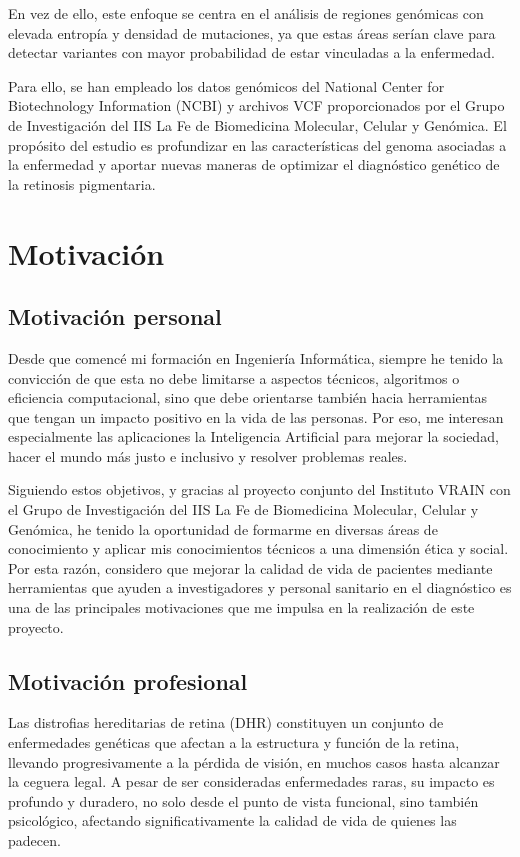 \documentclass[11pt,spanish,listoffigures,listoftables]{tfgetsinf}
\begin{document}
 

En vez de ello, este enfoque se centra en el análisis de regiones genómicas con elevada entropía y densidad de mutaciones, ya que estas áreas serían clave para detectar variantes con mayor probabilidad de estar vinculadas a la enfermedad. 

 

Para ello, se han empleado los datos genómicos del National Center for Biotechnology Information (NCBI) y archivos VCF proporcionados por el Grupo de Investigación del IIS La Fe de Biomedicina Molecular, Celular y Genómica. El propósito del estudio es profundizar en las características del genoma asociadas a la enfermedad y aportar nuevas maneras de optimizar el diagnóstico genético de la retinosis pigmentaria. 

\section{Motivación}

\subsection{Motivación personal}
Desde que comencé mi formación en Ingeniería Informática, siempre he tenido la convicción de que esta no debe limitarse a aspectos técnicos, algoritmos o eficiencia computacional, sino que debe orientarse también hacia herramientas que tengan un impacto positivo en la vida de las personas. Por eso, me interesan especialmente las aplicaciones la Inteligencia Artificial para mejorar la sociedad, hacer el mundo más justo e inclusivo y resolver problemas reales.  

Siguiendo estos objetivos, y gracias al proyecto conjunto del Instituto VRAIN con el Grupo de Investigación del IIS La Fe de Biomedicina Molecular, Celular y Genómica, he tenido la oportunidad de formarme en diversas áreas de conocimiento y aplicar mis conocimientos técnicos a una dimensión ética y social. Por esta razón, considero que mejorar la calidad de vida de pacientes mediante herramientas que ayuden a investigadores y personal sanitario en el diagnóstico es una de las principales motivaciones que me impulsa en la realización de este proyecto. 

\subsection{Motivación profesional}
Las distrofias hereditarias de retina (DHR) constituyen un conjunto de enfermedades genéticas que afectan a la estructura y función de la retina, llevando progresivamente a la pérdida de visión, en muchos casos hasta alcanzar la ceguera legal. A pesar de ser consideradas enfermedades raras, su impacto es profundo y duradero, no solo desde el punto de vista funcional, sino también psicológico, afectando significativamente la calidad de vida de quienes las padecen\cite{STO}.
\end{document}
